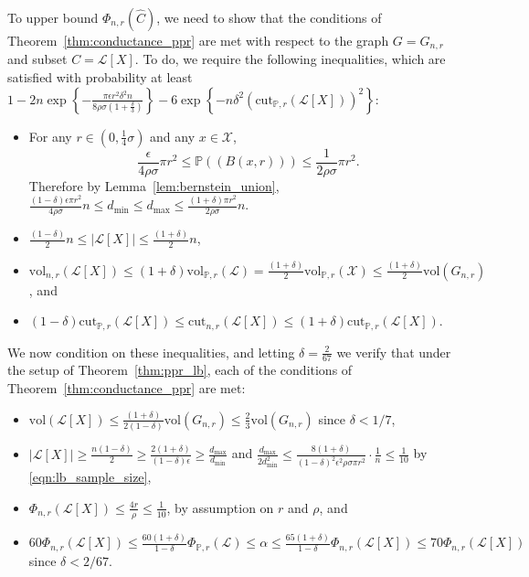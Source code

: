 \documentclass[11pt,twoside]{article}
\newcommand{\set}[1]{\left\{#1\right\}}
\newcommand{\vol}{\mathrm{vol}}
\newcommand{\cut}{\mathrm{cut}}
\newcommand{\abs}[1]{\left \lvert #1 \right \rvert}
\newcommand{\1}{\mathbf{1}}
\newcommand{\Xbf}{X}             %
\newcommand{\Pbb}{\mathbb{P}}
\begin{document}
To upper bound $\Phi_{n,r}(\widehat{C})$, we need to show that the conditions of Theorem~\ref{thm:conductance_ppr} are met with respect to the graph $G = G_{n,r}$ and subset $C = \mathcal{L}[\Xbf]$. To do, we require the following inequalities, which are satisfied with probability at least $1 - 2n\exp\set{-\frac{\pi\epsilon r^2\delta^2n}{8 \rho \sigma(1 + \frac{\delta}{3})}} - 6 \exp\set{-n\delta^2(\cut_{\Pbb,r}(\mathcal{L}[\Xbf]))^2}$: 
\begin{itemize}
	\item For any $r \in (0,\frac{1}{4}\sigma)$ and any $x \in \mathcal{X}$,
	\begin{equation*}
	\frac{\epsilon}{4\rho\sigma}\pi r^2 \leq \Pbb((B(x,r))) \leq  \frac{1}{2\rho\sigma} \pi r^2.
	\end{equation*}
	Therefore by Lemma~\ref{lem:bernstein_union}, $\frac{(1 - \delta)\epsilon \pi r^2}{4\rho \sigma}n \leq d_{\min} \leq d_{\max} \leq \frac{(1 + \delta)\pi r^2}{2\rho \sigma }n$. 
	\item $\frac{(1 - \delta)}{2} n \leq \abs{\mathcal{L}[\Xbf]} \leq \frac{(1 + \delta)}{2} n$, 
	\item $\vol_{n,r}(\mathcal{L}[\Xbf]) \leq (1 + \delta)\vol_{\Pbb,r}(\mathcal{L}) = \frac{(1 + \delta)}{2} \vol_{\Pbb,r}(\mathcal{X}) \leq \frac{(1 + \delta)}{2} \vol(G_{n,r})$, and
	\item $(1 - \delta) \cut_{\Pbb,r}(\mathcal{L}[\Xbf]) \leq \cut_{n,r}(\mathcal{L}[\Xbf]) \leq (1 + \delta) \cut_{\Pbb,r}(\mathcal{L}[\Xbf])$.
\end{itemize}
We now condition on these inequalities, and letting $\delta = \frac{2}{67}$ we verify that under the setup of Theorem~\ref{thm:ppr_lb}, each of the conditions of Theorem~\ref{thm:conductance_ppr} are met:
\begin{itemize}
	\item $\vol(\mathcal{L}[X]) \leq \frac{(1 + \delta)}{2(1 - \delta)}\vol(G_{n,r}) \leq \frac{2}{3}\vol(G_{n,r})$ since $\delta < 1/7$,
	\item $\abs{\mathcal{L}[X]} \geq \frac{n(1 - \delta)}{2} \geq \frac{2(1 + \delta)}{(1 - \delta)\epsilon} \geq \frac{d_{\max}}{d_{\min}}$ and $\frac{d_{\max}}{2d_{\min}^2} \leq \frac{8(1 + \delta)}{(1 - \delta)^2 \epsilon^2 \rho \sigma \pi r^2} \cdot \frac{1}{n} \leq \frac{1}{10}$ by \eqref{eqn:lb_sample_size},
	\item $\Phi_{n,r}(\mathcal{L}[X]) \leq \frac{4r}{\rho} \leq \frac{1}{10}$, by assumption on $r$ and $\rho$, and
	\item $60\Phi_{n,r}(\mathcal{L}[X]) \leq \frac{60(1 + \delta)}{1 - \delta}\Phi_{\Pbb,r}(\mathcal{L}) \leq \alpha \leq \frac{65(1 + \delta)}{1 - \delta}\Phi_{n,r}(\mathcal{L}[X]) \leq 70\Phi_{n,r}(\mathcal{L}[X])$ since $\delta < 2/67$. 
\end{itemize}
\end{document}
